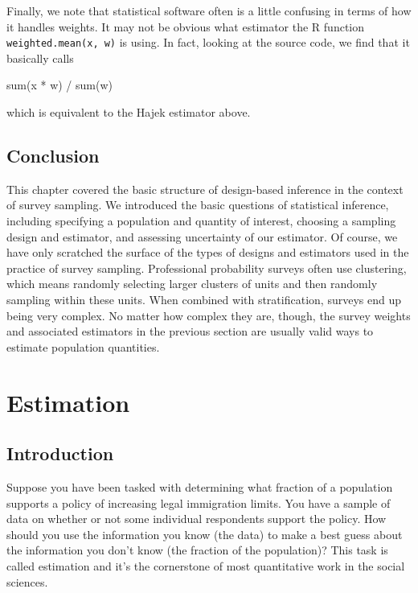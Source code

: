 \documentclass[
  letterpaper,
  DIV=11,
  numbers=noendperiod]{scrreprt}
\newenvironment{Shaded}{\begin{snugshade}}{\end{snugshade}}
\newcommand{\FunctionTok}[1]{\textcolor[rgb]{0.28,0.35,0.67}{#1}}
\newcommand{\NormalTok}[1]{\textcolor[rgb]{0.00,0.23,0.31}{#1}}
\newcommand{\SpecialCharTok}[1]{\textcolor[rgb]{0.37,0.37,0.37}{#1}}
\theoremstyle{definition}
\theoremstyle{definition}
\theoremstyle{plain}
\theoremstyle{remark}
\begin{document}
Finally, we note that statistical software often is a little confusing
in terms of how it handles weights. It may not be obvious what estimator
the R function \texttt{weighted.mean(x,\ w)} is using. In fact, looking
at the source code, we find that it basically calls

\begin{Shaded}
\begin{Highlighting}[]
\FunctionTok{sum}\NormalTok{(x }\SpecialCharTok{*}\NormalTok{ w) }\SpecialCharTok{/} \FunctionTok{sum}\NormalTok{(w)}
\end{Highlighting}
\end{Shaded}

which is equivalent to the Hajek estimator above.

\hypertarget{conclusion}{%
\section{Conclusion}\label{conclusion}}

This chapter covered the basic structure of design-based inference in
the context of survey sampling. We introduced the basic questions of
statistical inference, including specifying a population and quantity of
interest, choosing a sampling design and estimator, and assessing
uncertainty of our estimator. Of course, we have only scratched the
surface of the types of designs and estimators used in the practice of
survey sampling. Professional probability surveys often use clustering,
which means randomly selecting larger clusters of units and then
randomly sampling within these units. When combined with stratification,
surveys end up being very complex. No matter how complex they are,
though, the survey weights and associated estimators in the previous
section are usually valid ways to estimate population quantities.

\hypertarget{estimation}{%
\chapter{Estimation}\label{estimation}}

\hypertarget{introduction-2}{%
\section{Introduction}\label{introduction-2}}

Suppose you have been tasked with determining what fraction of a
population supports a policy of increasing legal immigration limits. You
have a sample of data on whether or not some individual respondents
support the policy. How should you use the information you know (the
data) to make a best guess about the information you don't know (the
fraction of the population)? This task is called estimation and it's the
cornerstone of most quantitative work in the social sciences.
\end{document}
